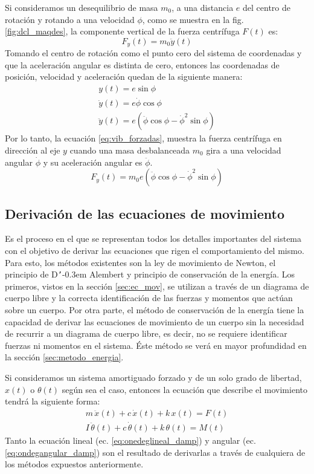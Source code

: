 Si consideramos un desequilibrio de masa $m_0$, a una distancia $e$ del centro de rotación y rotando a una velocidad $\phi$, como se muestra en la fig. \ref{fig:dcl_maqdes}, la componente vertical de la fuerza centrífuga $F(t)$ es:
\begin{equation}
	F_y(t) = m_0\ddot{y}(t)
\end{equation}
Tomando el centro de rotación como el punto cero del sistema de coordenadas y que la aceleración angular es distinta de cero, entonces las coordenadas de posición, velocidad y aceleración quedan de la siguiente manera:
\begin{gather*}
	y(t) = e \sin \phi\\
	\dot{y}(t) = e \dot{\phi}\cos \phi\\
	\ddot{y}(t) = e(\ddot{\phi}\cos\phi - \dot{\phi}^2\sin\phi)
\end{gather*}
Por lo tanto, la ecuación \ref{eq:vib_forzadas}, muestra la fuerza centrífuga en dirección al eje $y$ cuando una masa desbalanceada $m_0$ gira a una velocidad angular $\dot{\phi}$ y su aceleración angular es $\ddot{\phi}$.
\begin{equation}\label{eq:vib_forzadas}
	F_y(t) = m_0e(\ddot{\phi}\cos\phi- \dot{\phi}^2\sin\phi)
\end{equation}

\subsection{Derivación de las ecuaciones de movimiento}
Es el proceso en el que se representan todos los detalles importantes del sistema con el objetivo de derivar las ecuaciones que  rigen el comportamiento del mismo. Para esto, los métodos existentes son la ley de movimiento de Newton, el principio de D\texttt{'}\kern-0.3em Alembert y principio de conservación de la energía. Los primeros, vistos en la sección \ref{sec:ec_mov}, se utilizan a través de un diagrama de cuerpo libre y la correcta identificación de las fuerzas y momentos que actúan sobre un cuerpo. Por otra parte, el método de conservación de la energía tiene la capacidad de derivar las ecuaciones de movimiento de un cuerpo sin la necesidad de recurrir a un diagrama de cuerpo libre, es decir, no se requiere identificar fuerzas ni momentos en el sistema. Éste método se verá en mayor profundidad en la sección \ref{sec:metodo_energia}.

Si consideramos un sistema amortiguado forzado y de un solo grado de libertad, $x(t)$ o $\theta(t)$ según sea el caso, entonces la ecuación que describe el movimiento tendrá la siguiente forma:
\begin{subequations}
\begin{align}
	m\,\ddot{x}(t) + c\,\dot{x}(t) + k\,x(t) = F(t) \label{eq:onedeglineal_damp}\\
	I\,\ddot{\theta}(t) + c\,\dot{\theta}(t) + k\,\theta(t) = M(t) \label{eq:ondegangular_damp}
\end{align}
\end{subequations}
Tanto la ecuación lineal (ec. \ref{eq:onedeglineal_damp}) y angular (ec. \ref{eq:ondegangular_damp}) son el resultado de derivarlas a través de cualquiera de los métodos expuestos anteriormente.  
 
